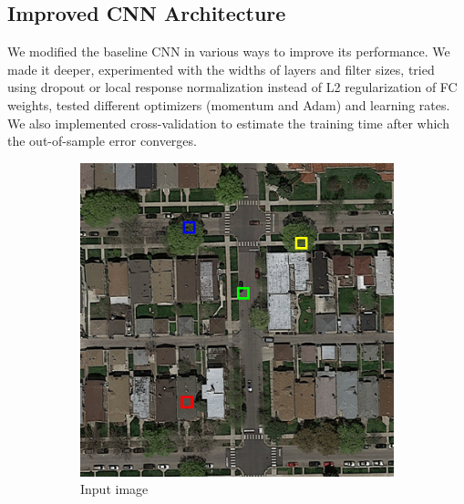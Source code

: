 \documentclass[10pt,conference,compsocconf]{IEEEtran}
\begin{document}
\subsection{Improved CNN Architecture}
\label{subsec:CNN}
We modified the baseline CNN in various ways to improve its performance. We made it deeper, experimented with the widths of layers and filter sizes, tried using dropout or local response normalization instead of L2 regularization of FC weights, tested different optimizers (momentum and Adam) and learning rates. We also implemented cross-validation to estimate the training time after which the out-of-sample error converges.

\begin{figure}
	\centering
	\begin{subfigure}[t]{.15\textwidth}
		\includegraphics[width=1\textwidth]{figs/context_size/full_img}
		\caption{Input image}
	\end{subfigure}
	\begin{subfigure}[t]{.15\textwidth}

\end{subfigure}
\end{figure}
\end{document}
